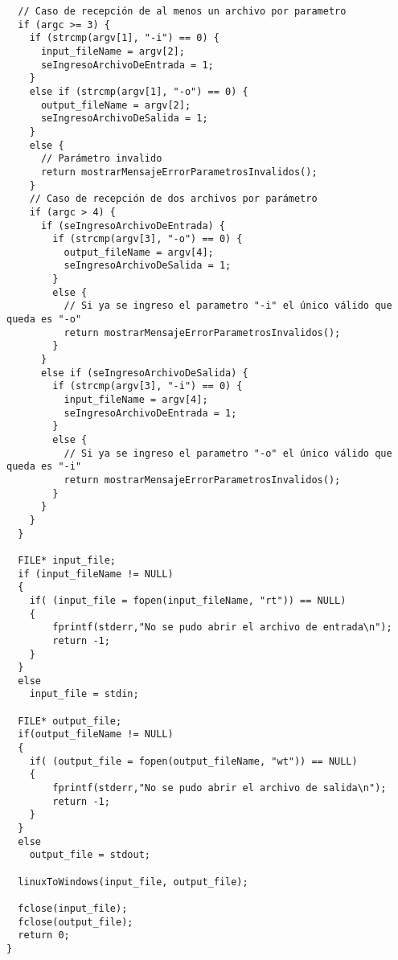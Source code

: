 \documentclass[a4paper,11pt]{article}
\begin{document}
\begin{verbatim}
  // Caso de recepción de al menos un archivo por parametro
  if (argc >= 3) {
    if (strcmp(argv[1], "-i") == 0) {
      input_fileName = argv[2];
      seIngresoArchivoDeEntrada = 1;
    }
    else if (strcmp(argv[1], "-o") == 0) {
      output_fileName = argv[2];
      seIngresoArchivoDeSalida = 1;
    }
    else {
      // Parámetro invalido
      return mostrarMensajeErrorParametrosInvalidos();
    }
    // Caso de recepción de dos archivos por parámetro
    if (argc > 4) {
      if (seIngresoArchivoDeEntrada) {
        if (strcmp(argv[3], "-o") == 0) {
          output_fileName = argv[4];
          seIngresoArchivoDeSalida = 1;
        }
        else {
          // Si ya se ingreso el parametro "-i" el único válido que queda es "-o"
          return mostrarMensajeErrorParametrosInvalidos();
        }
      }
      else if (seIngresoArchivoDeSalida) {
        if (strcmp(argv[3], "-i") == 0) {
          input_fileName = argv[4];
          seIngresoArchivoDeEntrada = 1;
        }
        else {
          // Si ya se ingreso el parametro "-o" el único válido que queda es "-i"
          return mostrarMensajeErrorParametrosInvalidos();
        }
      }
    }
  }

  FILE* input_file;
  if (input_fileName != NULL)
  {
    if( (input_file = fopen(input_fileName, "rt")) == NULL)
    {
        fprintf(stderr,"No se pudo abrir el archivo de entrada\n");
        return -1;
    }
  }
  else
    input_file = stdin;

  FILE* output_file;
  if(output_fileName != NULL)
  {
    if( (output_file = fopen(output_fileName, "wt")) == NULL)
    {
        fprintf(stderr,"No se pudo abrir el archivo de salida\n");
        return -1;
    }
  }
  else
    output_file = stdout;

  linuxToWindows(input_file, output_file);

  fclose(input_file);
  fclose(output_file);
  return 0;
}
\end{verbatim}
\end{document}
